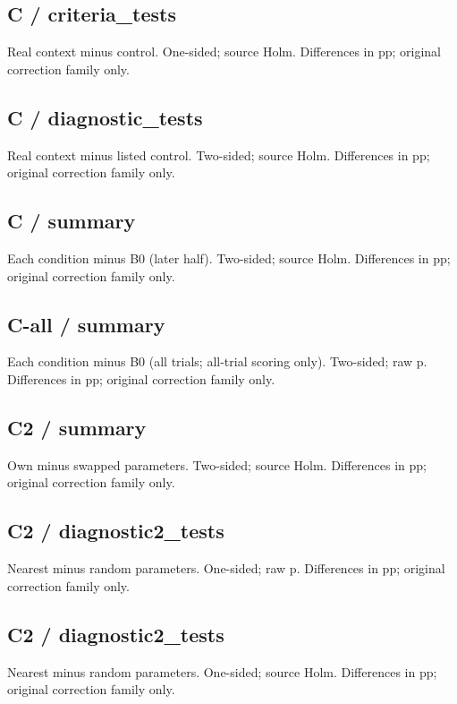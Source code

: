 \subsection*{C / criteria\_\allowbreak{}tests}
Real context minus control. One-sided; source Holm. Differences in pp; original correction family only. 

\subsection*{C / diagnostic\_\allowbreak{}tests}
Real context minus listed control. Two-sided; source Holm. Differences in pp; original correction family only. 

\subsection*{C / summary}
Each condition minus B0 (later half). Two-sided; source Holm. Differences in pp; original correction family only. 

\subsection*{C-all / summary}
Each condition minus B0 (all trials; all-trial scoring only). Two-sided; raw p. Differences in pp; original correction family only. 

\subsection*{C2 / summary}
Own minus swapped parameters. Two-sided; source Holm. Differences in pp; original correction family only. 

\subsection*{C2 / diagnostic2\_\allowbreak{}tests}
Nearest minus random parameters. One-sided; raw p. Differences in pp; original correction family only. 

\subsection*{C2 / diagnostic2\_\allowbreak{}tests}
Nearest minus random parameters. One-sided; source Holm. Differences in pp; original correction family only. 

